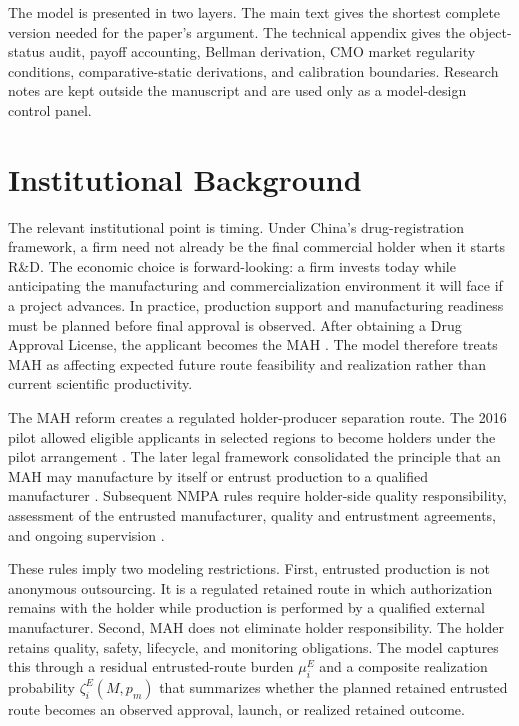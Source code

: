 \documentclass[12pt]{article}
\newcommand{\1}{\mathbf{1}}
\begin{document}
The model is presented in two layers. The main text gives the shortest complete version needed for the paper's argument. The technical appendix gives the object-status audit, payoff accounting, Bellman derivation, CMO market regularity conditions, comparative-static derivations, and calibration boundaries. Research notes are kept outside the manuscript and are used only as a model-design control panel.

\section{Institutional Background}

The relevant institutional point is timing. Under China's drug-registration framework, a firm need not already be the final commercial holder when it starts R\&D. The economic choice is forward-looking: a firm invests today while anticipating the manufacturing and commercialization environment it will face if a project advances. In practice, production support and manufacturing readiness must be planned before final approval is observed. After obtaining a Drug Approval License, the applicant becomes the MAH \citep{NMPARegistration2022}. The model therefore treats MAH as affecting expected future route feasibility and realization rather than current scientific productivity.

The MAH reform creates a regulated holder-producer separation route. The 2016 pilot allowed eligible applicants in selected regions to become holders under the pilot arrangement \citep{StateCouncilMAHPilot2016,CFDAMAHImplementation2016}. The later legal framework consolidated the principle that an MAH may manufacture by itself or entrust production to a qualified manufacturer \citep{DrugAdministrationLaw2019}. Subsequent NMPA rules require holder-side quality responsibility, assessment of the entrusted manufacturer, quality and entrustment agreements, and ongoing supervision \citep{NMPAHolderResponsibility2022,NMPAManufacturing2022,NMPAEntrustedProduction2023}.

These rules imply two modeling restrictions. First, entrusted production is not anonymous outsourcing. It is a regulated retained route in which authorization remains with the holder while production is performed by a qualified external manufacturer. Second, MAH does not eliminate holder responsibility. The holder retains quality, safety, lifecycle, and monitoring obligations. The model captures this through a residual entrusted-route burden $\mu_i^E$ and a composite realization probability $\zeta_i^E(M,p_m)$ that summarizes whether the planned retained entrusted route becomes an observed approval, launch, or realized retained outcome.
\end{document}
